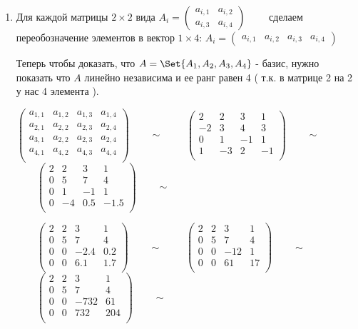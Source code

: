 \begin{enumerate}
    \item Для каждой матрицы $2 \times 2$ вида
	$A_i = \begin{pmatrix}a_{i, 1} & a_{i, 2} \\ a_{i, 3} & a_{i, 4}\end{pmatrix}\qquad$
	сделаем переобозначение элементов в вектор $1 \times 4$:
	$A_i = \begin{pmatrix}a_{i, 1} & a_{i,2} & a_{i,3} & a_{i,4}\end{pmatrix}$

	Теперь чтобы доказать, что $A = \Set{A_1, A_2, A_3, A_4}$ - базис, нужно показать что $A$ линейно независима и ее ранг равен 4 ( т.к. в матрице 2 на 2 у нас 4 элемента ).

	$\begin{pmatrix}
	a_{1, 1} & a_{1,2} & a_{1,3} & a_{1,4}\\
	a_{2, 1} & a_{2,2} & a_{2,3} & a_{2,4}\\
	a_{3, 1} & a_{2,2} & a_{2,3} & a_{2,4}\\
	a_{4, 1} & a_{4,2} & a_{4,3} & a_{4,4}\\
	\end{pmatrix}\qquad \sim $
	$\qquad\begin{pmatrix}
	2 & 2 & 3 & 1\\
	-2 & 3 & 4 & 3\\
	0 & 1 & -1 & 1\\
	1 & -3 & 2 & -1\\
	\end{pmatrix}\qquad \sim $
	$\qquad\begin{pmatrix}
	2 & 2 & 3 & 1\\
	0 & 5 & 7 & 4\\
	0 & 1 & -1 & 1\\
	0 & -4 & 0.5 & -1.5\\
	\end{pmatrix}\qquad \sim $

	$\qquad\begin{pmatrix}
	2 & 2 & 3 & 1\\
	0 & 5 & 7 & 4\\
	0 & 0 & -2.4 & 0.2\\
	0 & 0 & 6.1 & 1.7\\
	\end{pmatrix}\qquad \sim $
	$\qquad\begin{pmatrix}
	2 & 2 & 3 & 1\\
	0 & 5 & 7 & 4\\
	0 & 0 & -12 & 1\\
	0 & 0 & 61 & 17\\
	\end{pmatrix}\qquad \sim $
	$\qquad\begin{pmatrix}
	2 & 2 & 3 & 1\\
	0 & 5 & 7 & 4\\
	0 & 0 & -732 & 61\\
	0 & 0 & 732 & 204\\
	\end{pmatrix}\qquad \sim $


\end{enumerate}
